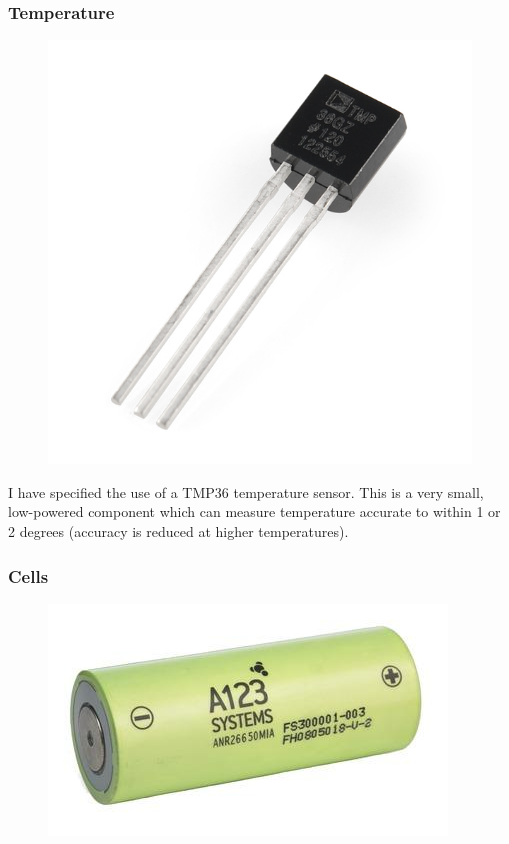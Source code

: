 \documentclass[a4paper, twoside]{article}
\begin{document}
\subsubsection{Temperature}
\begin{figure}
	\begin{center}
		\includegraphics[scale=0.4]{images/tmp36.jpg}
	\end{center}
\end{figure}

I have specified the use of a TMP36 temperature sensor. This is a very small,
low-powered component which can measure temperature accurate to within 1 or 2
degrees (accuracy is reduced at higher temperatures).

\subsubsection{Cells}
\begin{figure}
	\begin{center}
		\includegraphics[scale=0.15]{images/a123.jpg}
	\end{center}
\end{figure}
\end{document}
